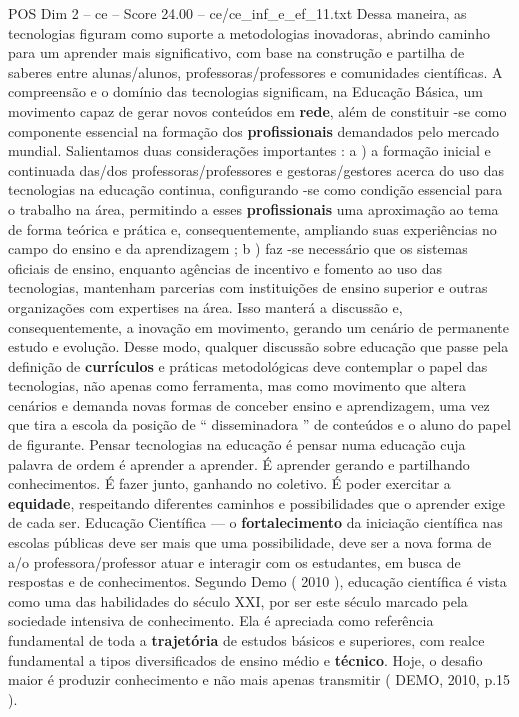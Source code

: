 \begin{textsample}{POS Dim 2 – ce – Score 24.00 – ce/ce\_inf\_e\_ef\_11.txt}
Dessa maneira, as tecnologias figuram como suporte a metodologias inovadoras, abrindo caminho para um aprender mais significativo, com base na construção e partilha de saberes entre alunas/alunos, professoras/professores e comunidades científicas.
A compreensão e o domínio das tecnologias significam, na Educação Básica, um movimento capaz de gerar novos conteúdos em \textbf{rede}, além de constituir -se como componente essencial na formação dos \textbf{profissionais} demandados pelo mercado mundial.
Salientamos duas considerações importantes : a ) a formação inicial e continuada das/dos professoras/professores e gestoras/gestores acerca do uso das tecnologias na educação continua, configurando -se como condição essencial para o trabalho na área, permitindo a esses \textbf{profissionais} uma aproximação ao tema de forma teórica e prática e, consequentemente, ampliando suas experiências no campo do ensino e da aprendizagem ; b ) faz -se necessário que os sistemas oficiais de ensino, enquanto agências de incentivo e fomento ao uso das tecnologias, mantenham parcerias com instituições de ensino superior e outras organizações com expertises na área.
Isso manterá a discussão e, consequentemente, a inovação em movimento, gerando um cenário de permanente estudo e evolução.
Desse modo, qualquer discussão sobre educação que passe pela definição de \textbf{currículos} e práticas metodológicas deve contemplar o papel das tecnologias, não apenas como ferramenta, mas como movimento que altera cenários e demanda novas formas de conceber ensino e aprendizagem, uma vez que tira a escola da posição de “ disseminadora ” de conteúdos e o aluno do papel de figurante.
Pensar tecnologias na educação é pensar numa educação cuja palavra de ordem é aprender a aprender.
É aprender gerando e partilhando conhecimentos.
É fazer junto, ganhando no coletivo.
É poder exercitar a \textbf{equidade}, respeitando diferentes caminhos e possibilidades que o aprender exige de cada ser.
Educação Científica — o \textbf{fortalecimento} da iniciação científica nas escolas públicas deve ser mais que uma possibilidade, deve ser a nova forma de a/o professora/professor atuar e interagir com os estudantes, em busca de respostas e de conhecimentos.
Segundo Demo ( 2010 ), educação científica é vista como uma das habilidades do século XXI, por ser este século marcado pela sociedade intensiva de conhecimento.
Ela é apreciada como referência fundamental de toda a \textbf{trajetória} de estudos básicos e superiores, com realce fundamental a tipos diversificados de ensino médio e \textbf{técnico}.
Hoje, o desafio maior é produzir conhecimento e não mais apenas transmitir ( DEMO, 2010, p.15 ).

\end{textsample}
